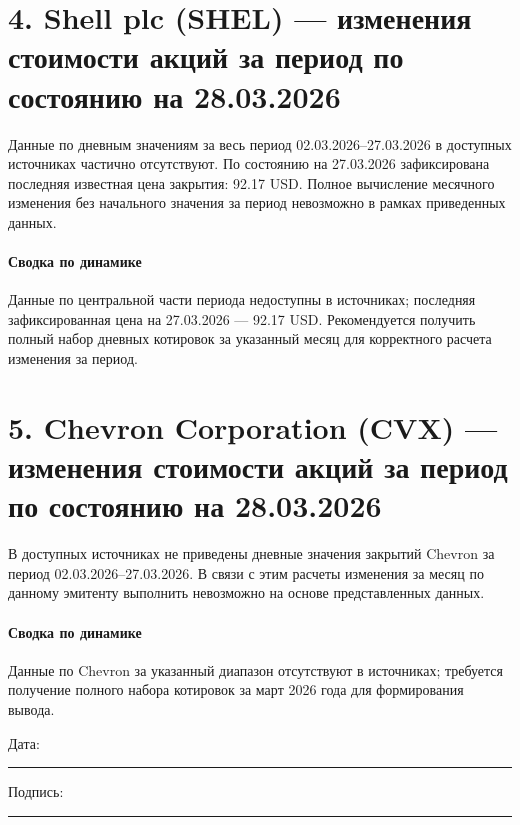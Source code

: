 \documentclass[12pt]{article}
\begin{document}
\section*{4. Shell plc (SHEL) — изменения стоимости акций за период по состоянию на 28.03.2026}
Данные по дневным значениям за весь период 02.03.2026–27.03.2026 в доступных источниках частично отсутствуют. По состоянию на 27.03.2026 зафиксирована последняя известная цена закрытия: 92.17 USD. Полное вычисление месячного изменения без начального значения за период невозможно в рамках приведенных данных.

\paragraph*{Сводка по динамике}
Данные по центральной части периода недоступны в источниках; последняя зафиксированная цена на 27.03.2026 — 92.17 USD. Рекомендуется получить полный набор дневных котировок за указанный месяц для корректного расчета изменения за период.

\section*{5. Chevron Corporation (CVX) — изменения стоимости акций за период по состоянию на 28.03.2026}
В доступных источниках не приведены дневные значения закрытий Chevron за период 02.03.2026–27.03.2026. В связи с этим расчеты изменения за месяц по данному эмитенту выполнить невозможно на основе представленных данных.

\paragraph*{Сводка по динамике}
Данные по Chevron за указанный диапазон отсутствуют в источниках; требуется получение полного набора котировок за март 2026 года для формирования вывода.

\vfill

\noindent
Дата: \rule{5cm}{0.4pt} \hfill Подпись: \rule{5cm}{0.4pt}
\end{document}
